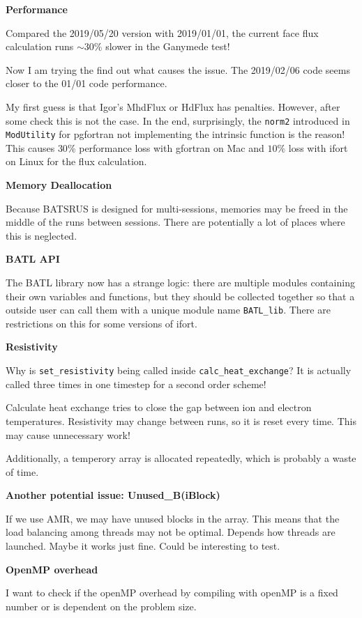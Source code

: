 \documentclass[11pt]{book} %
\begin{document}
\textbf{Performance}

Compared the 2019/05/20 version with 2019/01/01, the current face flux calculation runs $\sim30\%$ slower in the Ganymede test!

Now I am trying the find out what causes the issue. The 2019/02/06 code seems closer to the 01/01 code performance.

My first guess is that Igor's MhdFlux or HdFlux has penalties. However, after some check this is not the case. In the end, surprisingly, the \verb|norm2| introduced in \verb|ModUtility| for pgfortran not implementing the intrinsic function is the reason! This causes $30\%$ performance loss with gfortran on Mac and $10\%$ loss with ifort on Linux for the flux calculation.

\textbf{Memory Deallocation}

Because BATSRUS is designed for multi-sessions, memories may be freed in the middle of the runs between sessions. There are potentially a lot of places where this is neglected.

\textbf{BATL API}

The BATL library now has a strange logic: there are multiple modules containing their own variables and functions, but they should be collected together so that a outside user can call them with a unique module name \verb|BATL_lib|. There are restrictions on this for some versions of ifort.

\textbf{Resistivity}

Why is \verb|set_resistivity| being called inside \verb|calc_heat_exchange|? It is actually called three times in one timestep for a second order scheme!

Calculate heat exchange tries to close the gap between ion and electron temperatures. Resistivity may change between runs, so it is reset every time. This may cause unnecessary work!

Additionally, a temperory array is allocated repeatedly, which is probably a waste of time.

\textbf{Another potential issue: Unused\_B(iBlock)}

If we use AMR, we may have unused blocks in the array. This means that the load balancing among threads may not be optimal. Depends how threads are launched. Maybe it works just fine. Could be interesting to test.

\textbf{OpenMP overhead}

I want to check if the openMP overhead by compiling with openMP is a fixed number or is dependent on the problem size.
\end{document}
